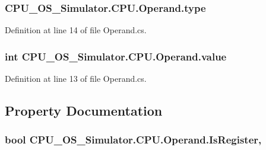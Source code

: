 \subsubsection[{type}]{ C\+P\+U\+\_\+\+O\+S\+\_\+\+Simulator.\+C\+P\+U.\+Operand.\+type\hspace{0.3cm}{\ttfamily [private]}}\label{class_c_p_u___o_s___simulator_1_1_c_p_u_1_1_operand_abc8f504a22e9a5c49d91b12f61cc5119}


Definition at line 14 of file Operand.\+cs.

\hypertarget{class_c_p_u___o_s___simulator_1_1_c_p_u_1_1_operand_a59d05c39a45091805c9506b1852f9bde}{}
\subsubsection[{value}]{\setlength{\rightskip}{0pt plus 5cm}int C\+P\+U\+\_\+\+O\+S\+\_\+\+Simulator.\+C\+P\+U.\+Operand.\+value\hspace{0.3cm}{\ttfamily [private]}}\label{class_c_p_u___o_s___simulator_1_1_c_p_u_1_1_operand_a59d05c39a45091805c9506b1852f9bde}


Definition at line 13 of file Operand.\+cs.



\subsection{Property Documentation}
\hypertarget{class_c_p_u___o_s___simulator_1_1_c_p_u_1_1_operand_a662aacb6eb1aa9cf818181aea695e0c9}{}
\subsubsection[{Is\+Register}]{\setlength{\rightskip}{0pt plus 5cm}bool C\+P\+U\+\_\+\+O\+S\+\_\+\+Simulator.\+C\+P\+U.\+Operand.\+Is\+Register\hspace{0.3cm}{\ttfamily [get]}, {\ttfamily [set]}}\label{class_c_p_u___o_s___simulator_1_1_c_p_u_1_1_operand_a662aacb6eb1aa9cf818181aea695e0c9}



